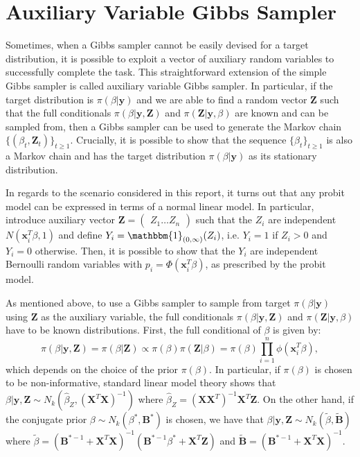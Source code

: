 \documentclass{article}
\newcommand{\IF}[2]{\mathbbm{1}_{#1}(#2)} %
\renewcommand{\vec}[1]{\mathbf{#1}}
\begin{document}
\section{Auxiliary Variable Gibbs Sampler}
Sometimes, when a Gibbs sampler cannot be easily devised for a target distribution, it is possible to exploit a vector of auxiliary random variables to successfully complete the task. This straightforward extension of the simple Gibbs sampler is called auxiliary variable Gibbs sampler. In particular, if the target distribution is \(\pi(\beta|\vec{y})\) and we are able to find a random vector \(\vec{Z}\) such that the full conditionals \(\pi(\beta|\vec{y}, \vec{Z})\) and \(\pi(\vec{Z}|\vec{y}, \beta)\) are known and can be sampled from, then a Gibbs sampler can be used to generate the Markov chain \(\{(\beta_t, \vec{Z}_t)\}_{t\geq 1}\). Crucially, it is possible to show that the sequence \(\{\beta_t\}_{t\geq 1}\) is also a Markov chain and has the target distribution \(\pi(\beta|\vec{y})\) as its stationary distribution. 
\par
In regards to the scenario considered in this report, it turns out that any probit model can be expressed in terms of a normal linear model. In particular, introduce auxiliary vector \(\vec{Z} = \begin{pmatrix} Z_1 \hdots Z_n \end{pmatrix}\) such that the \(Z_i\) are independent \(N(\vec{x}_i^T \beta, 1)\) and define \(Y_i = \IF{(0, \infty)}{Z_i}\), i.e. \(Y_i = 1\) if \(Z_i > 0\) and \(Y_i = 0\) otherwise. Then, it is possible to show that the \(Y_i\) are independent Bernoulli random variables with \(p_i = \Phi(\vec{x}_i^T\beta)\), as prescribed by the probit model. 
\par 
As mentioned above, to use a Gibbs sampler to sample from target \(\pi(\beta|\vec{y})\) using \(\vec{Z}\) as the auxiliary variable, the full conditionals \(\pi(\beta|\vec{y}, \vec{Z})\) and \(\pi(\vec{Z}|\vec{y}, \beta)\) have to be known distributions. First, the full conditional of \(\beta\) is given by:
\begin{equation*}
    \pi(\beta|\vec{y}, \vec{Z}) = \pi(\beta|\vec{Z}) \propto \pi(\beta) \pi(\vec{Z}|\beta) = \pi(\beta) \prod_{i=1}^n\phi(\vec{x}_i^T \beta),
\end{equation*}
which depends on the choice of the prior \(\pi(\beta)\). In particular, if \(\pi(\beta)\) is chosen to be non-informative, standard linear model theory shows that \(\beta|\vec{y}, \vec{Z} \sim N_k(\hat{\beta}_Z, (\vec{X}^T\vec{X})^{-1})\) where \(\hat{\beta}_Z = (\vec{X} \vec{X}^T)^{-1}\vec{X}^T \vec{Z}\). On the other hand, if the conjugate prior \(\beta \sim N_k(\beta^*, \vec{B}^*)\) is chosen, we have that \(\beta | \vec{y}, \vec{Z} \sim N_k(\tilde{\beta}, \tilde{\vec{B}})\) where \(\tilde{\beta} = (\vec{B}^{*-1} + \vec{X}^T\vec{X})^{-1}(\vec{B}^{*-1}\beta^* + \vec{X}^T\vec{Z})\) and \(\tilde{\vec{B}} = (\vec{B}^{*-1} + \vec{X}^T\vec{X})^{-1}\). 
\end{document}
